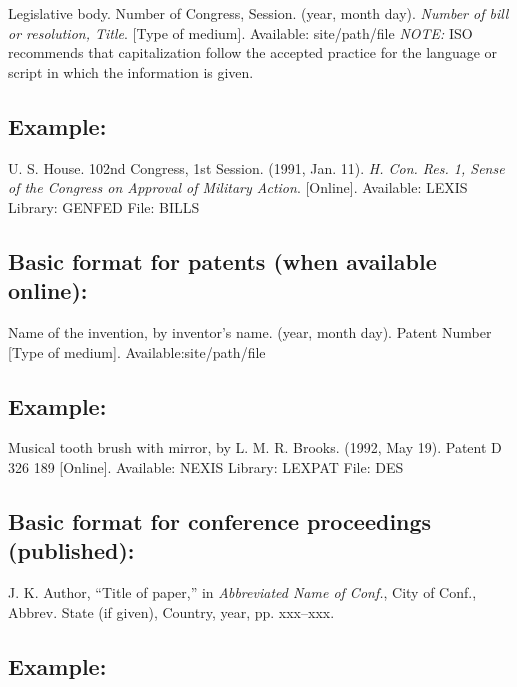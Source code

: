 Legislative body. Number of Congress, Session. (year, month day). {\em Number of bill or resolution, Title}. [Type of medium]. Available: site/path/file
{\em NOTE:} ISO recommends that capitalization follow the accepted practice for the language or script in which the information is given.

\subsection*{Example:}

\begin{thebibliography}{34}
\setcounter{enumiv}{19}

\bibitem{}U. S. House. 102nd Congress, 1st Session. (1991, Jan. 11). {\em H. Con. Res. 1, Sense of the Congress on Approval of Military Action}. [Online]. Available: LEXIS Library: GENFED File: BILLS 
\end{thebibliography}

\subsection*{Basic format for patents (when available online):}

Name of the invention, by inventor’s name. (year, month day). Patent Number [Type of medium]. Available:site/path/file

\subsection*{Example:}

\begin{thebibliography}{34}
\setcounter{enumiv}{20}

\bibitem{}Musical tooth brush with mirror, by L. M. R. Brooks. (1992, May 19). Patent D 326 189
[Online]. Available: NEXIS Library: LEXPAT File:   DES 

\end{thebibliography}

\subsection*{Basic format for conference proceedings (published):}

J. K. Author, ``Title of paper,'' in {\em Abbreviated Name of Conf.}, City of Conf., Abbrev. State (if given), Country, year, pp. xxx--xxx.

\subsection*{Example:}

